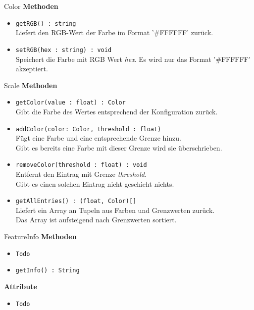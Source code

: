     \begin{Class}{Color}
        \textbf{Methoden}
        \begin{itemize}
            \item \texttt{getRGB() : string}
            \\ Liefert den RGB-Wert der Farbe im Format '\#FFFFFF' zurück.
            \item \texttt{setRGB(hex : string) : void}
            \\ Speichert die Farbe mit RGB Wert \emph{hex}. Es wird nur das Format '\#FFFFFF' akzeptiert.
        \end{itemize}
    \end{Class}

    \begin{Class}{Scale}
        \textbf{Methoden}
        \begin{itemize}
            \item \texttt{getColor(value : float) : Color}
            \\ Gibt die Farbe des Wertes entsprechend der Konfiguration zurück.
            \item \texttt{addColor(color: Color, threshold : float)}
            \\ Fügt eine Farbe und eine entsprechende Grenze hinzu.
            \\ Gibt es bereits eine Farbe mit dieser Grenze wird sie überschrieben.
            \item \texttt{removeColor(threshold : float) : void}
            \\ Entfernt den Eintrag mit Grenze \emph{threshold}.
            \\ Gibt es einen solchen Eintrag nicht geschieht nichts.
            \item \texttt{getAllEntries() : (float, Color)[]}
            \\ Liefert ein Array an Tupeln aus Farben und Grenzwerten zurück.
            \\ Das Array ist aufsteigend nach Grenzwerten sortiert.
        \end{itemize}
    \end{Class}

    \begin{Class}{FeatureInfo}
        \textbf{Methoden}
        \begin{itemize}
            \item \texttt{Todo}
            \item \texttt{getInfo() : String}
        \end{itemize}
        
        \textbf{Attribute}
        \begin{itemize}
            \item \texttt{Todo}
        \end{itemize}
    \end{Class}

